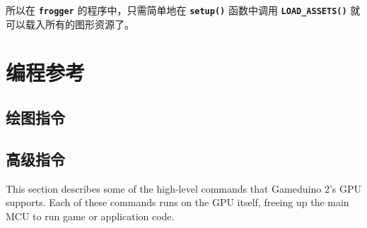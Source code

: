 \documentclass[10pt]{book}
\makeatletter
\newcommand{\mach}[1]{\texttt{\textbf{#1}}}
\newcommand{\cmdidx}[1]{
\index{#1@\mach{#1()}}
}
\newcommand{\cmd}[1]{\cmdidx{cmd\_#1}\nameref{cmd:#1}}
\makeatother
\begin{document}
\begin{CJK}{UTF8}{gkai}
\noindent
所以在 \mach{frogger} 的程序中，只需简单地在 \mach{setup()} 
函数中调用 \mach{LOAD\_ASSETS()} 就可以载入所有的图形资源了。



\part{编程参考}

\chapter{绘图指令}

\newcommand{\drawcmd}[2]{
\newpage
\section{\texttt{#1}}
\label{#1}
\index{#1@\mach{#1()}|boldindex}

#2

}

\newcommand{\lightcmd}[3]{
\section{\texttt{#1}}
\label{#2}
\index{#1@\mach{#1()}|boldindex}


}



\chapter{高级指令}

This section describes some of the high-level commands
that Gameduino 2's GPU 
supports.
Each of these commands runs on the GPU itself, freeing up the main MCU to
run game or application code.



\end{CJK}
\end{document}
